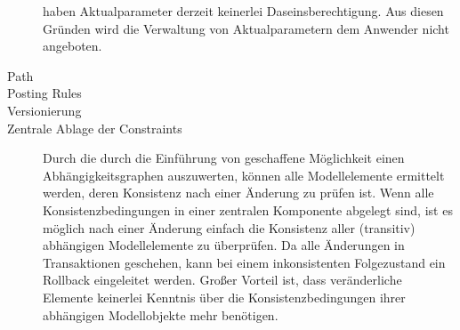 \begin{description}
  haben Aktualparameter derzeit keinerlei Daseinsberechtigung. Aus diesen Gründen wird die Verwaltung von Aktualparametern dem Anwender nicht angeboten.
  \item[Path] 
  \item[Posting Rules] 
  \item[Versionierung] 
  \item[Zentrale Ablage der Constraints] Durch die durch die Einführung von  geschaffene Möglichkeit einen Abhängigkeitsgraphen 
		auszuwerten, können alle Modellelemente ermittelt werden, deren Konsistenz nach einer Änderung zu prüfen ist. Wenn alle Konsistenzbedingungen 
		in einer zentralen Komponente abgelegt sind, ist es möglich nach einer Änderung einfach die Konsistenz aller (transitiv) abhängigen Modellelemente zu überprüfen. 
		Da alle Änderungen in Transaktionen geschehen, kann bei einem inkonsistenten Folgezustand ein Rollback eingeleitet werden.
		Großer Vorteil ist, dass veränderliche Elemente keinerlei Kenntnis über die Konsistenzbedingungen ihrer abhängigen Modellobjekte mehr benötigen.
\end{description}

  